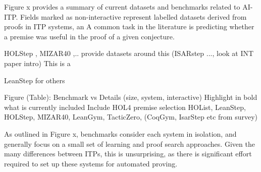 \documentclass[letterpaper]{article} %
\begin{document}
    Figure x provides a summary of current datasets and benchmarks related to AI-ITP.
    Fields marked as non-interactive represent labelled datasets derived from proofs in ITP systems, an
    A common task in the literature is predicting whether a premise was useful in the proof of a given conjecture.

    HOLStep \cite{kaliszyk_holstep_2017}, MIZAR40 \cite{kaliszyk_mizar_2015},.. provide datasets around this (ISARstep ..., look at INT paper intro)
    This is a


    LeanStep for others

    Figure (Table):
    Benchmark vs Details (size, system, interactive)
    Highlight in bold what is currently included
    Include HOL4 premise selection
    HOList, LeanStep, HOLStep, MIZAR40, LeanGym, TacticZero, (CoqGym, IsarStep etc from survey)

    As outlined in Figure x, benchmarks consider each system in isolation, and generally focus on a small set of
    learning and proof search approaches.
    Given the many differences between ITPs, this is unsurprising, as there is significant effort required to set
    up these systems for automated proving.

%
%
\end{document}
